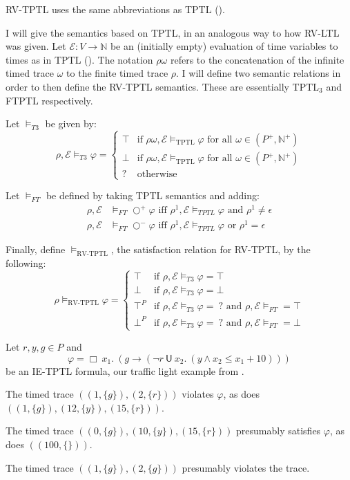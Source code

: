 \documentclass[a4paper]{article}
\newcommand{\U}{\mathsf{U}}
\newcommand{\tand}{\text{ and }}
\newcommand{\tor}{\text{ or }}
\newcommand{\tiff}{\text{ iff }}
\newcommand{\fall}{\text{ for all }}
\newcommand{\sn}{\bigcirc^+}
\newcommand{\wn}{\bigcirc^-}
\newcommand{\eval}{\mathcal{E}}
\begin{document}
  RV-TPTL uses the same abbreviations as TPTL ().

\begin{defn}\label{rvtptlsem}

  I will give the semantics based on TPTL, in an analogous way to how RV-LTL was given.
  Let $\eval:V\to\mathbb{N}$ be an (initially empty) evaluation of time variables to times as in TPTL ().
  The notation $\rho\omega$ refers to the concatenation of the infinite timed trace $\omega$ to the finite timed trace $\rho$.
  I will define two semantic relations in order to then define the RV-TPTL semantics. These are essentially TPTL$_3$ and FTPTL respectively.

  Let $\vDash_{T3}$ be given by:
  \[\rho,\eval\vDash_{T3}\varphi = \begin{cases}
    \top & \text{if } \rho\omega,\eval \vDash_{\text{TPTL}} \varphi \fall \omega \in (P^+,\mathbb{N}^+)\\
    \bot & \text{if }  \rho\omega,\eval \vDash_{\text{TPTL}} \varphi \fall \omega \in (P^+,\mathbb{N}^+)\\
      ? & \text{otherwise}
    \end{cases}
  \]

  Let $\vDash_{FT}$ be defined by taking TPTL semantics and adding:
  \begin{align*}\label{ftsem}
    \rho,\eval&\vDash_{FT}\sn\varphi \tiff \rho^1,\eval\vDash_{TPTL}\varphi \tand \rho^1 \neq \epsilon\\
    \rho,\eval&\vDash_{FT}\wn\varphi \tiff \rho^1,\eval\vDash_{TPTL}\varphi \tor \rho^1 = \epsilon
  \end{align*}

  Finally, define $\vDash_{\text{RV-TPTL}}$, the satisfaction relation for RV-TPTL, by the following:
  \[\rho\vDash_{\text{RV-TPTL}}\varphi =
    \begin{cases}
      \top & \text{if } \rho,\eval\vDash_{T3} \varphi = \top\\
      \bot & \text{if } \rho,\eval \vDash_{T3} \varphi = \bot\\
      \top^P & \text{if } \rho,\eval \vDash_{T3} \varphi = ~?\tand \rho,\eval\vDash_{FT} = \top \\
      \bot^P & \text{if } \rho,\eval \vDash_{T3} \varphi = ~?\tand \rho,\eval\vDash_{FT} = \bot
    \end{cases}
  \]
\end{defn}

\begin{eg}
  Let $r,y,g\in P$ and \[\varphi = \Box ~x_1.~ (g \to (\neg r ~\U~ x_2.~ (y \land x_2 \leq x_1 + 10) ))\] be an IE-TPTL formula, our traffic light example from .

  The timed trace $((1,\{g\}),(2,\{r\}))$ violates $\varphi$,
  as does $((1,\{g\}),(12,\{y\}),(15,\{r\}))$.

  The timed trace $((0,\{g\}),(10,\{y\}),(15,\{r\}))$ presumably satisfies $\varphi$, as does $((100,\{\}))$.

  The timed trace $((1,\{g\}),(2,\{g\}))$ presumably violates the trace.
\end{eg}
\end{document}
